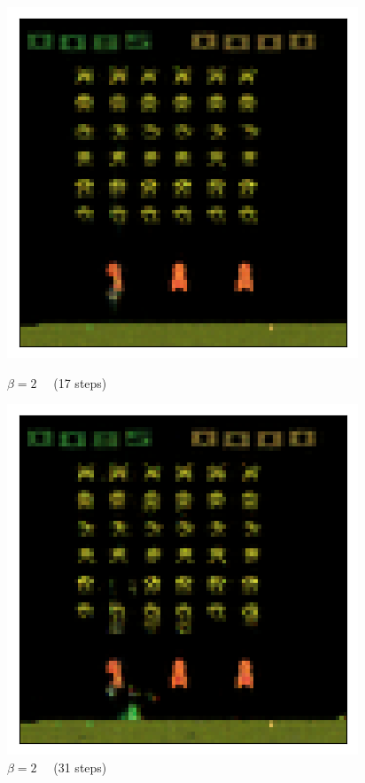 \begin{figure}[h!]
\begin{multicols}{4}
    \includegraphics[scale=0.4]{figures/results/colour_separated/beta_2_posterior_sample_17.png}
    \caption{$\beta=2\quad$ (17 steps)}
    \includegraphics[scale=0.4]{figures/results/colour_separated/beta_2_posterior_sample_31.png}
    \caption{$\beta=2\quad$ (31 steps)}
\end{multicols}


\end{figure}
